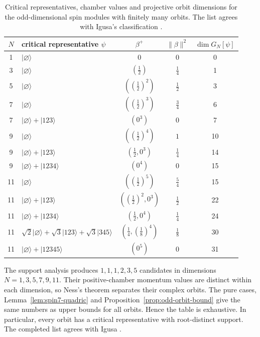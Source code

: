 \documentclass{article}
\theoremstyle{definition}
\theoremstyle{remark}
\newcommand{\ket}[1]{\lvert #1\rangle}
\newcommand{\norm}[1]{\lVert #1\rVert}
\begin{document}
\begin{table}[t]
\centering
\renewcommand{\arraystretch}{1.15}
\small
\begin{tabular}{c l c c c}
\toprule
$N$ & critical representative $\psi$ & $\beta^+$ &
$\norm\beta^2$ & $\dim G_N[\psi]$\\
\midrule
1 & $\ket\varnothing$ & $0$ & $0$ & 0\\
3 & $\ket\varnothing$ & $(\frac12)$ & $\frac14$ & 1\\
5 & $\ket\varnothing$ & $((\frac12)^2)$ & $\frac12$ & 3\\
\midrule
7 & $\ket\varnothing$ & $((\frac12)^3)$ & $\frac34$ & 6\\
7 & $\ket\varnothing+\ket{123}$ & $(0^3)$ & $0$ & 7\\
\midrule
9 & $\ket\varnothing$ & $((\frac12)^4)$ & $1$ & 10\\
9 & $\ket\varnothing+\ket{123}$ & $(\frac12,0^3)$ & $\frac14$ & 14\\
9 & $\ket\varnothing+\ket{1234}$ & $(0^4)$ & $0$ & 15\\
\midrule
11 & $\ket\varnothing$ & $((\frac12)^5)$ & $\frac54$ & 15\\
11 & $\ket\varnothing+\ket{123}$ & $((\frac12)^2,0^3)$ & $\frac12$ & 22\\
11 & $\ket\varnothing+\ket{1234}$ & $(\frac12,0^4)$ & $\frac14$ & 24\\
11 & $\sqrt2\ket\varnothing+\sqrt3\ket{123}+\sqrt3\ket{345}$
   & $(\frac14,(\frac18)^4)$ & $\frac18$ & 30\\
11 & $\ket\varnothing+\ket{12345}$ & $(0^5)$ & $0$ & 31\\
\bottomrule
\end{tabular}
\caption{Critical representatives, chamber values and projective orbit
dimensions for the odd-dimensional spin modules with
finitely many orbits. The list agrees with Igusa's classification
\cite{Igusa1970uptodim12}.}
\label{tab:finite-odd}
\end{table}

The support analysis produces $1,1,1,2,3,5$ candidates in dimensions
$N=1,3,5,7,9,11$.  Their positive-chamber momentum values are distinct
within each dimension, so Ness's theorem separates their complex orbits.
The pure cases, Lemma~\ref{lem:spin7-quadric} and
Proposition~\ref{prop:odd-orbit-bound} give the same numbers as upper
bounds for all orbits. Hence the table is exhaustive. In particular,
every orbit has a critical representative with root-distinct support.
The completed list agrees with Igusa \cite{Igusa1970uptodim12}.
\end{document}
